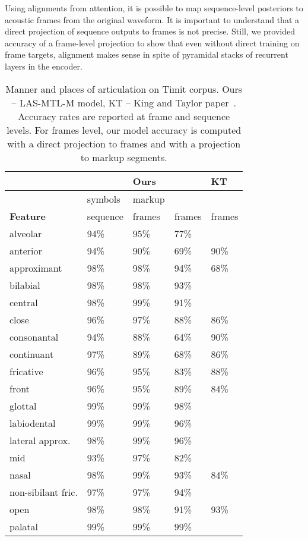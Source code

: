 \documentclass[a4paper]{article}
\begin{document}
Using alignments from attention, it is possible to map sequence-level posteriors to acoustic frames from the original waveform. It is important to understand that a direct projection of sequence outputs to frames is not precise. Still, we provided accuracy of a frame-level projection to show that even without direct training on frame targets, alignment makes sense in spite of pyramidal stacks of recurrent layers in the encoder.
\begin{table}[th]
  \caption{Manner and places of articulation on Timit corpus. Ours -- LAS-MTL-M model, KT -- King and Taylor paper~\cite{King-2000}. Accuracy rates are reported at frame and sequence levels. For frames level, our model accuracy is computed with a direct projection to frames and with a projection to markup segments.}
  \label{tab:BinfTimit}
\centering
  \begin{tabular}{llll|l}
    \toprule
                     &  & \textbf{Ours} & & \textbf{KT} \\
    \midrule
                     & symbols & markup & & \\
    \textbf{Feature} & sequence & frames & frames & frames \\
    \midrule
alveolar & 94\% & 95\% & 77\% \\
anterior & 94\% & 90\% & 69\% & 90\% \\
approximant & 98\% & 98\% & 94\% & 68\% \\
bilabial & 98\% & 98\% & 93\% \\
central & 98\% & 99\% & 91\% \\
close & 96\% & 97\% & 88\% & 86\% \\
consonantal & 94\% & 88\% & 64\% & 90\% \\
continuant & 97\% & 89\% & 68\% & 86\% \\
fricative & 96\% & 95\% & 83\% & 88\% \\
front & 96\% & 95\% & 89\% & 84\% \\
glottal & 99\% & 99\% & 98\% \\
labiodental & 99\% & 99\% & 96\% \\
lateral approx. & 98\% & 99\% & 96\% \\
mid & 93\% & 97\% & 82\% & \\
nasal & 98\% & 99\% & 93\% & 84\% \\
non-sibilant fric. & 97\% & 97\% & 94\% \\
open & 98\% & 98\% & 91\% & 93\% \\
palatal & 99\% & 99\% & 99\% \\

\end{tabular}
\end{table}
\end{document}
